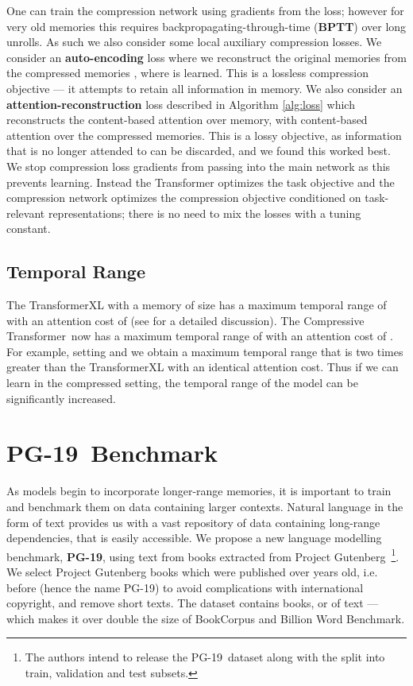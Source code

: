 \documentclass{article} \usepackage{iclr2020_conference,times}
\newcommand{\model}{Compressive Transformer}
\newcommand{\dataset}{PG-19}
\begin{document}
One can train the compression network using gradients from the loss; however for very old memories this requires backpropagating-through-time (\textbf{BPTT}) over long unrolls. As such we also consider some local auxiliary compression losses. We consider an \textbf{auto-encoding} loss where we reconstruct the original memories from the compressed memories , where  is learned. This is a lossless compression objective --- it attempts to retain all information in memory. We also consider an \textbf{attention-reconstruction} loss described in Algorithm \ref{alg:loss} which reconstructs the content-based attention over memory, with content-based attention over the compressed memories. This is a lossy objective, as information that is no longer attended to can be discarded, and we found this worked best. We stop compression loss gradients from passing into the main network as this prevents learning. Instead the Transformer optimizes the task objective and the compression network optimizes the compression objective conditioned on task-relevant representations; there is no need to mix the losses with a tuning constant.

\subsection{Temporal Range}
The TransformerXL with a memory of size  has a maximum temporal range of  with an attention cost of  (see \cite{dai2019transformer} for a detailed discussion). The \model~now has a maximum temporal range of  with an attention cost of . For example, setting  and  we obtain a maximum temporal range that is two times greater than the TransformerXL with an identical attention cost. Thus if we can learn in the  compressed setting, the temporal range of the model can be significantly increased.  
\section{\dataset~Benchmark}
As models begin to incorporate longer-range memories, it is important to train and benchmark them on data containing larger contexts. Natural language in the form of text provides us with a vast repository of data containing long-range dependencies, that is easily accessible.  We propose a new language modelling benchmark, \textbf{\dataset}, using text from books extracted from Project Gutenberg~\footnote{The authors intend to release the \dataset~dataset along with the split into train, validation and test subsets.}. We select Project Gutenberg books which were published over  years old, i.e. before  (hence the name \dataset ) to avoid complications with international copyright, and remove short texts. The dataset contains  books, or  of text --- which makes it over double the size of BookCorpus and Billion Word Benchmark. 
\end{document}
